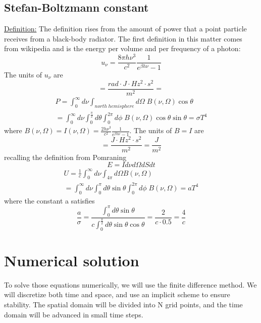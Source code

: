 \documentclass{article}
\begin{document}
\subsection*{Stefan-Boltzmann constant}
\underline{Definition:} The definition rises from the amount of power that a point particle receives from a black-body radiator.
The first definition in this matter comes from wikipedia and is the energy per volume and per frequency of a photon:
\begin{equation}
    u_\nu =  \frac{8\pi h \nu^3}{c^2}\frac{1}{e^{\beta h \nu}-1}
\end{equation}
The units of $u_\nu$ are
\begin{equation}
    [u_\nu] = \frac{rad\cdot J\cdot Hz^2\cdot s^2}{m^2}=\frac{}{}
\end{equation}
\begin{align}
    P=\int_0^\infty d\nu\int_{north\;hemisphere}d\Omega \;B(\nu,\Omega)\cos\theta \\ =\int_0^\infty d\nu \int_0^{\frac{\pi}{2}}d\theta \int_0^{2\pi}d\phi \;B(\nu,\Omega)\cos\theta\sin\theta =\sigma T^4
\end{align}
where $B(\nu,\Omega)=I(\nu,\Omega)=\frac{2h\nu^3}{c^2}\frac{1}{e^{\beta h\nu}-1}$.
The units of $B=I$ are
\begin{equation}
    [B]=\frac{J\cdot Hz^2\cdot s^2}{m^2}=\frac{J}{m^2}
\end{equation}
recalling the definition from Pomraning
\begin{equation}
    E=Id\nu d\Omega dS dt
\end{equation}
\begin{align}
    U=\frac{1}{c}\int_0^\infty d\nu \int_{4\pi} d\Omega B(\nu,\Omega) \\
    =\int_0^\infty d\nu \int_0^{\pi}d\theta\sin\theta \int_0^{2\pi}d\phi \;B(\nu,\Omega) =a T^4
\end{align}
where the constant a satisfies
\begin{equation}
    \frac{a}{\sigma}=\frac{\int_0^{\pi}d\theta\sin\theta}{c\int_0^\frac{\pi}{2}d\theta\sin\theta\cos\theta}=\frac{2}{c\cdot0.5}=\frac{4}{c}
\end{equation}
\section{Numerical solution}
To solve those equations numerically, we will use the finite difference method. 
We will discretize both time and space, and use an implicit scheme to ensure stability. 
The spatial domain will be divided into N grid points, and the time domain will 
be advanced in small time steps.
\end{document}
